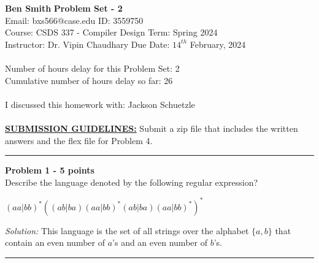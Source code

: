 \documentclass[a4paper, 11pt]{article}
\newenvironment{problem}[2][Problem]
    { \begin{mdframed}[backgroundcolor=gray!20] \textbf{#1 #2} \\}
    {  \end{mdframed}}
\newenvironment{solution}
    {\textit{Solution:}}
    {}
\begin{document}
\noindent
\large\textbf{Ben Smith} \hfill \textbf{Problem Set - 2}   \\
Email: bxs566@case.edu \hfill ID: 3559750 \\
\normalsize Course: CSDS 337 - Compiler Design \hfill Term: Spring 2024\\
Instructor: Dr. Vipin Chaudhary \hfill Due Date: $14^{th}$ February, 2024 \\ \\
Number of hours delay for this Problem Set: \hfill 2\\
Cumulative number of hours delay so far: \hfill 26 \\ \\
I discussed this homework with: \hfill Jackson Schuetzle \\ \\
\underline{\bf SUBMISSION GUIDELINES:} Submit a zip file that includes the written answers and the flex file for Problem 4. \\

\noindent\rule{7in}{2.8pt}
\begin{problem}{1 - 5 points}
Describe the language denoted by the following regular expression?

$(aa|bb)^*((ab|ba)(aa|bb)^*(ab|ba)(aa|bb)^*)^*$



\end{problem}
\begin{solution}
    This language is the set of all strings over the alphabet $\{a, b\}$ that contain an even number of $a$'s and an even number of $b$'s.

\end{solution}
\noindent\rule{7in}{2.8pt}

\end{document}
